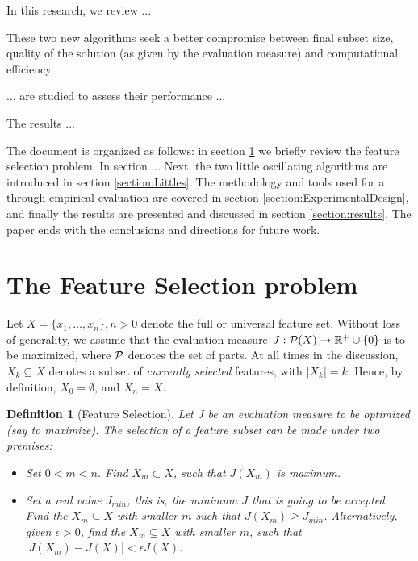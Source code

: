 \documentclass{article}
\newtheorem{definition}{Definition}
\begin{document}
In this research, we review ...

These two new algorithms seek a
better compromise between final subset size, quality of the solution
(as given by the evaluation measure) and computational efficiency.

... are studied to assess their performance ...

The results ...

The document is organized as follows: in section
\ref{section:FeatureSelection} we briefly review the feature selection
problem. In section ... Next,
the two little oscillating algorithms are introduced in section
\ref{section:Littles}. The methodology and tools used for a through
empirical evaluation are covered in section
\ref{section:ExperimentalDesign}, and finally the results are
presented and discussed in section \ref{section:results}. The paper ends with
the conclusions and directions for future work.


\section{The Feature Selection problem}
\label{section:FeatureSelection}

Let $X = \{x_1, \ldots, x_n\}, n>0$ denote the full or universal
feature set.  Without loss of generality, we assume that the
evaluation measure $J:{\cal P}(X) \rightarrow \mathbb{R}^{+} \cup \{ 0
\} $ is to be maximized, where ${\cal P}$ denotes the set of parts. At
all times in the discussion, $X_k \subseteq X$ denotes a subset of
\textit{currently selected} features, with $|X_k| = k$. Hence, by
definition, $X_0 = \emptyset$, and $X_n = X$.

\begin{definition}[Feature Selection] 
\label{def-fs}
Let $J$ be an evaluation measure to be optimized (say to
maximize). The selection of a feature subset can be made under two
premises:

\begin{itemize}
 \item Set $0 < m < n$. Find  $X_m \subset X$, such that
$J(X_m)$ is maximum.
\item Set a real value $J_{min}$, this is, the minimum $J$ that is going to be
  accepted. Find the $X_m \subseteq X$ with smaller $m$ such that
  $J(X_m) \geq J_{min}$. Alternatively, given $\epsilon>0$, find the $X_m
  \subseteq X$ with smaller $m$, such that $|J(X_m) - J(X)| <
  \epsilon J(X)$.
\end{itemize}
\end{definition}
\end{document}
